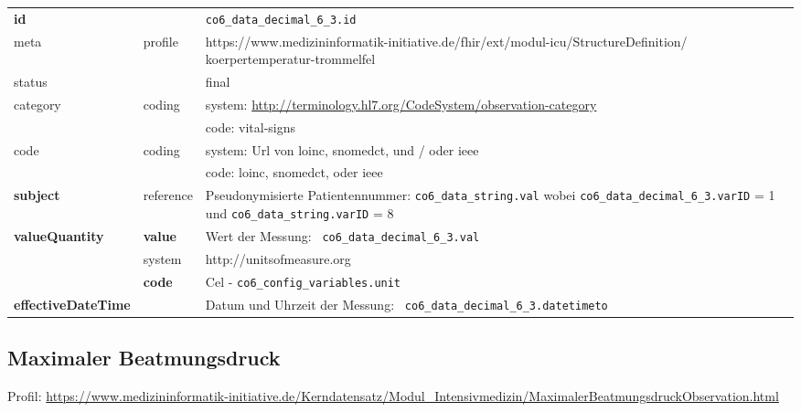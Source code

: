 \begin{longtable}{|l|l|p{7.5cm}|}
	\hline
	\rowcolor{lightgray} \multicolumn{3}{|l|}{Data Mapping (inhaltlich)} \\ \hline
	\textbf{id} &  & \texttt{co6\_data\_decimal\_6\_3.id} \\ \hline
	meta & profile & https://www.medizininformatik-initiative.de/fhir/ext/modul-icu/StructureDefinition/ koerpertemperatur-trommelfel \\ \hline 
	status &  & final   \\ \hline 
	category & coding & system: \url{http://terminology.hl7.org/CodeSystem/observation-category} \\
	\cline{3-3}
	& & code: vital-signs \\ \hline
	code & coding & system: Url von \ac{loinc}, \ac{snomedct}, und / oder \ac{ieee} \\ 
	\cline{3-3} 
	&  & code: \ac{loinc}, \ac{snomedct}, oder \ac{ieee} \\ \hline
	\textbf{subject} & reference & Pseudonymisierte Patientennummer: \texttt{co6\_data\_string.val} wobei \texttt{co6\_data\_decimal\_6\_3.varID} = 1 und \texttt{co6\_data\_string.varID} = 8 \\ \hline
	\textbf{valueQuantity}  & \textbf{value} & Wert der Messung: \texttt{
		co6\_data\_decimal\_6\_3.val} \\
	\cline{2-3}
	& system & http://unitsofmeasure.org \\
	\cline{2-3}
	& \textbf{code} & Cel - \texttt{co6\_config\_variables.unit} \\ \hline
	\textbf{effectiveDateTime}  & & Datum und Uhrzeit der Messung: \texttt{
		co6\_data\_decimal\_6\_3.datetimeto} \\ \hline
\end{longtable}

\subsection{Maximaler Beatmungsdruck} 
 Profil: \url{https://www.medizininformatik-initiative.de/Kerndatensatz/Modul_Intensivmedizin/MaximalerBeatmungsdruckObservation.html}

